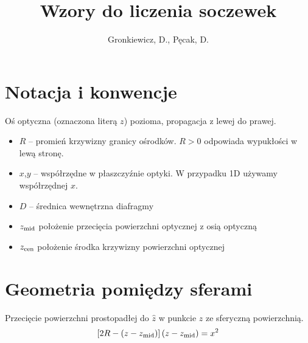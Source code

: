 \documentclass[11pt,a4paper,twocolumn]{article}
\author{Gronkiewicz, D., Pęcak, D.}
\title{Wzory do liczenia soczewek}
\begin{document}
\section{Notacja i konwencje}
Oś optyczna (oznaczona literą $z$) pozioma, propagacja z lewej do prawej.
\begin{itemize}
\item $R$ -- promień krzywizny granicy ośrodków. $R>0$ odpowiada wypukłości w lewą stronę.
\item $x$,$y$ -- współrzędne w płaszczyźnie optyki. W przypadku 1D używamy współrzędnej $x$.
\item $D$ -- średnica wewnętrzna diafragmy
\item $z_{\rm mid}$ położenie przecięcia powierzchni optycznej z osią optyczną
\item $z_{\rm cen}$ położenie środka krzywizny powierzchni optycznej
\end{itemize}

\section{Geometria pomiędzy sferami}

Przecięcie powierzchni prostopadłej do $\hat z$ w punkcie $z$ ze sferyczną powierzchnią.
\begin{equation}
\left[ 2R - ( z - z_{\rm mid} ) \right] \left( z - z_{\rm mid} \right) = x^2
\end{equation}
\end{document}
